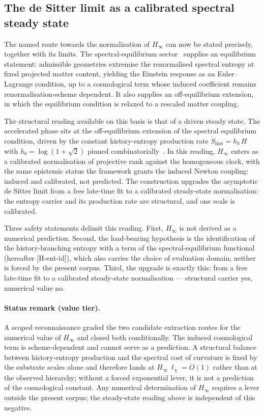 \subsection{The de Sitter limit as a calibrated spectral steady state}
\label{subsec:desitter-steady-state}

The named route towards the normalisation of $H_\infty$ can now be stated precisely, together with its
limits.
The spectral-equilibrium sector~\cite{Beau2026Thermodynamics} supplies an equilibrium statement: admissible
geometries extremise the renormalised spectral entropy at fixed projected matter content, yielding the
Einstein response as an Euler--Lagrange condition, up to a cosmological term whose induced coefficient
remains renormalisation-scheme dependent.
It also supplies an off-equilibrium extension, in which the equilibrium condition is relaxed to a rescaled
matter coupling.

The structural reading available on this basis is that of a driven steady state.
The accelerated phase sits at the off-equilibrium extension of the spectral equilibrium condition, driven by
the constant history-entropy production rate $\dot S_{\mathrm{hist}} = h_b\,H$ with
$h_b = \log(1+\sqrt2)$ pinned combinatorially~\cite{Beau2026tb}.
In this reading, $H_\infty$ enters as a calibrated normalisation of projective rank against the homogeneous
clock, with the same epistemic status the framework grants the induced Newton coupling: induced and
calibrated, not predicted.
The construction upgrades the asymptotic de Sitter limit from a free late-time fit to a calibrated
steady-state normalisation: the entropy carrier and its production rate are structural, and one scale is
calibrated.

Three safety statements delimit this reading.
First, $H_\infty$ is not derived as a numerical prediction.
Second, the load-bearing hypothesis is the identification of the history-branching entropy with a term of
the spectral-equilibrium functional (hereafter [H-ent-id]), which also carries the choice of evaluation
domain; neither is forced by the present corpus.
Third, the upgrade is exactly this: from a free late-time fit to a calibrated steady-state normalisation ---
structural carrier yes, numerical value no.

\paragraph{Status remark (value tier).}
A scoped reconnaissance graded the two candidate extraction routes for the numerical value of $H_\infty$ and
closed both conditionally.
The induced cosmological term is scheme-dependent and cannot serve as a prediction.
A structural balance between history-entropy production and the spectral cost of curvature is fixed by the
substrate scales alone and therefore lands at $H_\infty\,\ell_\chi = O(1)$ rather than at the observed
hierarchy; without a forced exponential lever, it is not a prediction of the cosmological constant.
Any numerical determination of $H_\infty$ requires a lever outside the present corpus; the steady-state
reading above is independent of this negative.

